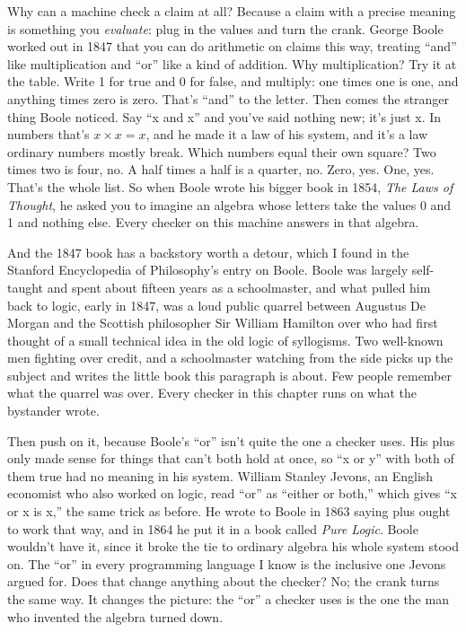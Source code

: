 \documentclass[11pt,twoside]{article}
\theoremstyle{thielethm}
\theoremstyle{thieledef}
\theoremstyle{thieledef}
\theoremstyle{thieledef}
\theoremstyle{thielethm}
\theoremstyle{thieleobs}
\theoremstyle{thielethm}
\begin{document}
Why can a machine check a claim at all? Because a claim with a precise meaning is something you
\emph{evaluate}: plug in the values and turn the crank. George Boole worked out in 1847 that you
can do arithmetic on claims this way, treating ``and'' like multiplication and ``or'' like a kind
of addition. Why multiplication? Try it at the table. Write 1 for true and 0 for false, and
multiply: one times one is one, and anything times zero is zero. That's ``and'' to the letter.
Then comes the stranger thing Boole noticed. Say ``x and x'' and you've said nothing new; it's just x.
In numbers that's $x \times x = x$, and he made it a law of his system, and it's a law ordinary
numbers mostly break. Which numbers equal their own square? Two times two is four, no. A half
times a half is a quarter, no. Zero, yes. One, yes. That's the whole list. So when Boole wrote his
bigger book in 1854, \emph{The Laws of Thought}, he asked you to imagine an algebra whose letters
take the values 0 and 1 and nothing else. Every checker on this machine answers in that algebra.

And the 1847 book has a backstory worth a detour, which I found in the Stanford Encyclopedia of
Philosophy's entry on Boole. Boole was largely self-taught and spent
about fifteen years as a schoolmaster, and what pulled him back to logic, early in 1847, was a
loud public quarrel between Augustus De Morgan and the Scottish philosopher Sir William
Hamilton over who had first thought of a small technical idea in the old logic of
syllogisms. Two well-known men fighting over credit, and a schoolmaster watching from the side
picks up the subject and writes the little book this paragraph is about. Few people remember
what the quarrel was over. Every checker in this chapter runs on what the bystander wrote.

Then push on it, because Boole's ``or'' isn't quite the one a checker uses. His plus only made
sense for things that can't both hold at once, so ``x or y'' with both of them true had no
meaning in his system. William Stanley Jevons, an English economist who also worked on logic, read
``or'' as ``either or both,'' which gives ``x or x is x,'' the same trick as before. He wrote to
Boole in 1863 saying plus ought to work that way, and in 1864 he put it in a book called
\emph{Pure Logic}. Boole wouldn't have it, since it broke the
tie to ordinary algebra his whole system stood on. The ``or'' in every programming language I know
is the inclusive one Jevons argued for. Does that change anything about the checker? No; the crank turns the same way. It
changes the picture: the ``or'' a checker uses is the one the man who invented the algebra
turned down.
\end{document}
